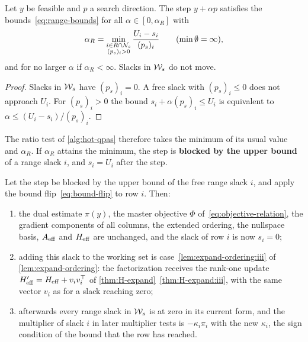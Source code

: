 \begin{prop} \label{prop:range-ratio}
Let $y$ be feasible and $p$ a search direction. The step $y + \alpha p$ satisfies the
bounds~\eqref{eq:range-bounds} for all $\alpha\in[0,\alpha_R]$ with
\[
\alpha_R = \min_{\substack{i\in R\cap\mathcal{N}_s\\ (p_s)_i>0}} \frac{U_i - s_i}{(p_s)_i}
\qquad(\min\emptyset = \infty),
\]
and for no larger $\alpha$ if $\alpha_R<\infty$. Slacks in $\mathcal{W}_s$ do not move.
\end{prop}

\begin{proof}
Slacks in $\mathcal{W}_s$ have $(p_s)_i = 0$. A free slack with $(p_s)_i\le0$ does not approach $U_i$.
For $(p_s)_i>0$ the bound $s_i + \alpha(p_s)_i\le U_i$ is equivalent to
$\alpha\le(U_i - s_i)/(p_s)_i$.
\end{proof}

The ratio test of \cref{alg:hot-qpas} therefore takes the minimum of its usual value and
$\alpha_R$. If $\alpha_R$ attains the minimum, the step is \textbf{blocked by the upper bound}
of a range slack $i$, and $s_i = U_i$ after the step.

\begin{theorem} \label{thm:flip-expand}
Let the step be blocked by the upper bound of the free range slack $i$, and apply the bound
flip~\eqref{eq:bound-flip} to row $i$. Then:
\begin{enumerate}
    \item \label{thm:flip-expand:i} the dual estimate $\pi(y)$, the master objective $\Phi$
          of~\eqref{eq:objective-relation}, the gradient components of all columns, the
          extended ordering, the nullspace basis, $A_{\mathrm{eff}}$ and $H_{\mathrm{eff}}$ are unchanged, and the
          slack of row $i$ is now $s_i = 0$;
    \item \label{thm:flip-expand:ii} adding this slack to the working set is case~\ref{lem:expand-ordering:iii}
          of \cref{lem:expand-ordering}: the factorization receives the rank-one update
          $H_{\mathrm{eff}}' = H_{\mathrm{eff}} + v_iv_i^\top$ of \cref{thm:H-expand}~\ref{thm:H-expand:iii}, with the same
          vector $v_i$ as for a slack reaching zero;
    \item \label{thm:flip-expand:iii} afterwards every range slack in $\mathcal{W}_s$ is at zero in its current form, and the
          multiplier of slack $i$ in later multiplier tests is $-\kappa_i\pi_i$ with the new
          $\kappa_i$, the sign condition of the bound that the row has reached.
\end{enumerate}
\end{theorem}

